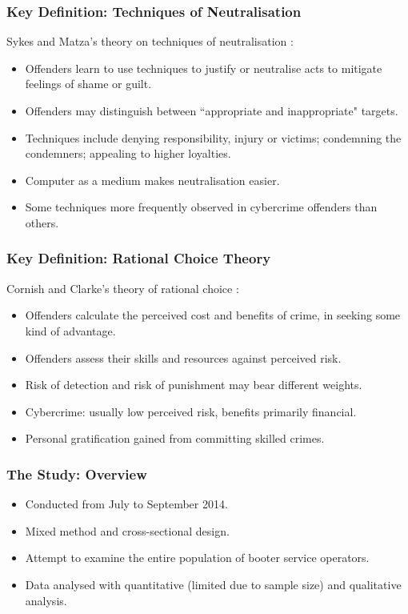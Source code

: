 \documentclass[aspectratio=1610]{beamer}
\begin{document}
\begin{frame}
\frametitle{Key Definition: Techniques of Neutralisation}
Sykes and Matza's theory on techniques of neutralisation \cite{sykes1957techniques}: \par
\begin{itemize}
\setlength\itemsep{1em}
\item Offenders learn to use techniques to justify or neutralise acts to mitigate feelings of shame or guilt.
\item Offenders may distinguish between ``appropriate and inappropriate" targets.
\item Techniques include denying responsibility, injury or victims; condemning the condemners; appealing to higher loyalties.  
\item Computer as a medium makes neutralisation easier.
\item Some techniques more frequently observed in cybercrime offenders than others.
\end{itemize}
\end{frame}

\begin{frame}
\frametitle{Key Definition: Rational Choice Theory}
Cornish and Clarke's theory of rational choice \cite{cornish1987understanding}: \par
\begin{itemize}
\setlength\itemsep{1em}
\item Offenders calculate the perceived cost and benefits of crime, in seeking some kind of advantage.
\item Offenders assess their skills and resources against perceived risk.
\item Risk of detection and risk of punishment may bear different weights.
\item Cybercrime: usually low perceived risk, benefits primarily financial.
\item Personal gratification gained from committing skilled crimes.
\end{itemize}
\end{frame}


\begin{frame}
\frametitle{The Study: Overview}
\begin{itemize}
\setlength\itemsep{1em}
\item Conducted from July to September 2014.
\item Mixed method and cross-sectional design.
\item Attempt to examine the entire population of booter service operators.
\item Data analysed with quantitative (limited due to sample size) and qualitative analysis. 
\end{itemize}
\end{frame}
\end{document}
